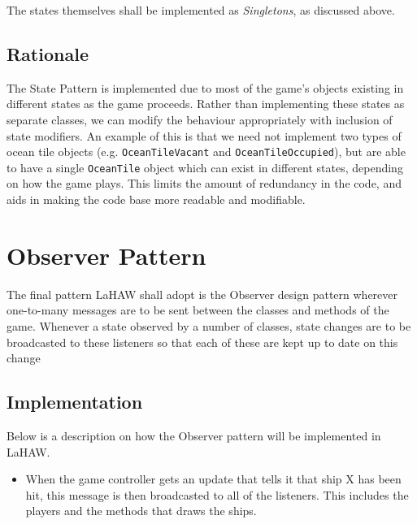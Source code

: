     The states themselves shall be implemented as \emph{Singletons}, as discussed above.
    
    \subsection{Rationale}
    The State Pattern is implemented due to most of the game's objects existing in different states as the game proceeds. Rather than implementing these states as separate classes, we can modify the behaviour appropriately with inclusion of state modifiers. An example of this is that we need not implement two types of ocean tile objects (e.g. \texttt{OceanTileVacant} and \texttt{OceanTileOccupied}), but are able to have a single \texttt{OceanTile} object which can exist in different states, depending on how the game plays. This limits the amount of redundancy in the code, and aids in making the code base more readable and modifiable.
    
    
    \section{Observer Pattern}
    The final pattern LaHAW shall adopt is the Observer design pattern wherever one-to-many messages are to be sent between the classes and methods of the game. Whenever a state observed by a number of classes, state changes are to be broadcasted to these listeners so that each of these are kept up to date on this change
    
    \subsection{Implementation}    
    Below is a description on how the Observer pattern will be implemented in LaHAW.
    
    \begin{itemize}
        \item When the game controller gets an update that tells it that ship X has been hit, this message is then broadcasted to all of the listeners. This includes the players and the methods that draws the ships.
    \end{itemize}
    
    
    
